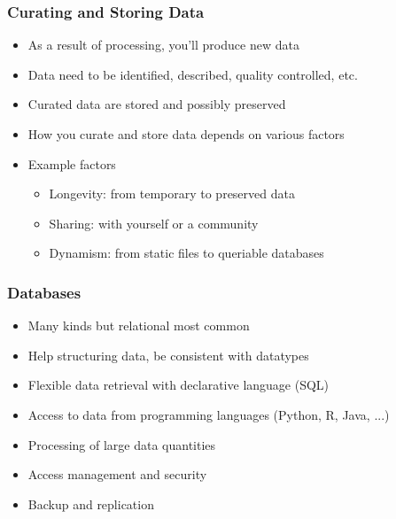 \documentclass{beamer}
\begin{document}
\begin{frame}
  \frametitle{Curating and Storing Data}
  
  \begin{itemize}
  \item As a result of processing, you'll produce new data
  \item Data need to be identified, described, quality controlled, etc.
  \item Curated data are stored and possibly preserved
  \item How you curate and store data depends on various factors
  \item Example factors
  \begin{itemize}
  \item Longevity: from temporary to preserved data
  \item Sharing: with yourself or a community
  \item Dynamism: from static files to queriable databases
  \end{itemize}
  \end{itemize}
\end{frame}

{
	\begin{frame}[plain]
	  \frametitle{Databases}
	  
	  \begin{itemize}
	  \item Many kinds but relational most common
	  \item Help structuring data, be consistent with datatypes
	  \item Flexible data retrieval with declarative language (SQL)
	  \item Access to data from programming languages (Python, R, Java, ...)
	  \item Processing of large data quantities
	  \item Access management and security
	  \item Backup and replication
	  \end{itemize}
	\end{frame}
}
\end{document}

